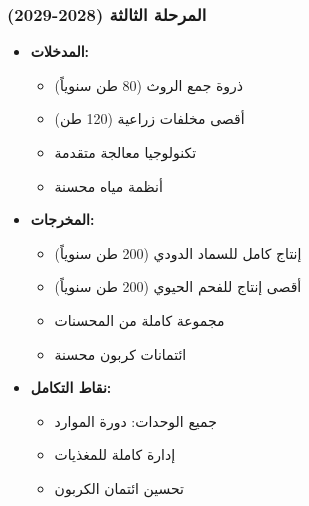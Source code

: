 \subsubsection{المرحلة الثالثة (2028-2029)}
\begin{itemize}
    \item \textbf{المدخلات:}
    \begin{itemize}
        \item ذروة جمع الروث (80 طن سنوياً)
        \item أقصى مخلفات زراعية (120 طن)
        \item تكنولوجيا معالجة متقدمة
        \item أنظمة مياه محسنة
    \end{itemize}
    \item \textbf{المخرجات:}
    \begin{itemize}
        \item إنتاج كامل للسماد الدودي (200 طن سنوياً)
        \item أقصى إنتاج للفحم الحيوي (200 طن سنوياً)
        \item مجموعة كاملة من المحسنات
        \item ائتمانات كربون محسنة
    \end{itemize}
    \item \textbf{نقاط التكامل:}
    \begin{itemize}
        \item جميع الوحدات: دورة الموارد
        \item إدارة كاملة للمغذيات
        \item تحسين ائتمان الكربون
    \end{itemize}
\end{itemize}

